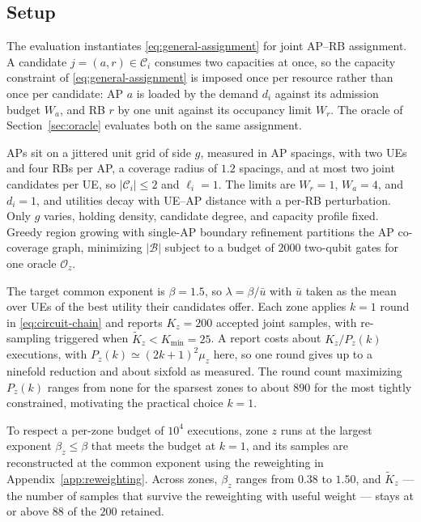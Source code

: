 \documentclass[journal]{IEEEtran}
\begin{document}
{\subsection{Setup}
\label{subsec:eval_setup}

The evaluation instantiates \eqref{eq:general-assignment} for joint AP--RB assignment. A candidate $j=(a,r)\in\mathcal{C}_i$ consumes two capacities at once, so the capacity constraint of \eqref{eq:general-assignment} is imposed once per resource rather than once per candidate: AP $a$ is loaded by the demand $d_i$ against its admission budget $W_a$, and RB $r$ by one unit against its occupancy limit $W_r$. The oracle of Section~\ref{sec:oracle} evaluates both on the same assignment.

APs sit on a jittered unit grid of side $g$, measured in AP spacings, with two UEs and four RBs per AP, a coverage radius of $1.2$ spacings, and at most two joint candidates per UE, so $|\mathcal{C}_i|\leq2$ and $\ell_i=1$. The limits are $W_r=1$, $W_a=4$, and $d_i=1$, and utilities decay with UE--AP distance with a per-RB perturbation. Only $g$ varies, holding density, candidate degree, and capacity profile fixed. Greedy region growing with single-AP boundary refinement partitions the AP co-coverage graph, minimizing $|\mathcal{B}|$ subject to a budget of $2000$ two-qubit gates for one oracle $\mathcal{O}_z$.

The target common exponent is $\beta=1.5$, so $\lambda=\beta/\bar{u}$ with $\bar{u}$ taken as the mean over UEs of the best utility their candidates offer. Each zone applies $k=1$ round in \eqref{eq:circuit-chain} and reports $K_z=200$ accepted joint samples, with re-sampling triggered when $\widetilde{K}_z<K_{\min}=25$. A report costs about $K_z/P_z(k)$ executions, with $P_z(k)\simeq(2k+1)^2\mu_z$ here, so one round gives up to a ninefold reduction and about sixfold as measured. The round count maximizing $P_z(k)$ ranges from none for the sparsest zones to about $890$ for the most tightly constrained, motivating the practical choice $k=1$.

To respect a per-zone budget of $10^4$ executions, zone $z$ runs at the largest exponent $\beta_z\leq\beta$ that meets the budget at $k=1$, and its samples are reconstructed at the common exponent using the reweighting in Appendix~\ref{app:reweighting}. Across zones, $\beta_z$ ranges from $0.38$ to $1.50$, and $\widetilde{K}_z$ --- the number of samples that survive the reweighting with useful weight --- stays at or above $88$ of the $200$ retained.

}
\end{document}

